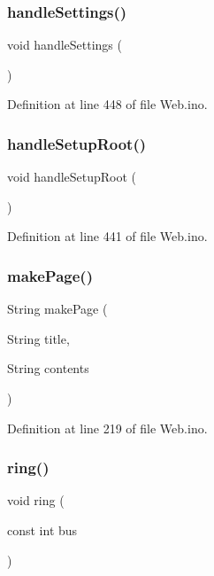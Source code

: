 \subsubsection{\texorpdfstring{handleSettings()}{handleSettings()}}
{\footnotesize\ttfamily void handle\+Settings (\begin{DoxyParamCaption}{ }\end{DoxyParamCaption})}



Definition at line 448 of file Web.\+ino.

\mbox{\label{_web_8ino_a211179d239a3a6fdc1ba1b6d7df252ae}} 
\subsubsection{\texorpdfstring{handleSetupRoot()}{handleSetupRoot()}}
{\footnotesize\ttfamily void handle\+Setup\+Root (\begin{DoxyParamCaption}{ }\end{DoxyParamCaption})}



Definition at line 441 of file Web.\+ino.

\mbox{\label{_web_8ino_a18fa0b0ca8bd45d3e784a6fd2d888b7d}} 
\subsubsection{\texorpdfstring{makePage()}{makePage()}}
{\footnotesize\ttfamily String make\+Page (\begin{DoxyParamCaption}\item[{String}]{title,  }\item[{String}]{contents }\end{DoxyParamCaption})}



Definition at line 219 of file Web.\+ino.

\mbox{\label{_web_8ino_a4b775e1d95473a982717aaa2da30e4f5}} 
\subsubsection{\texorpdfstring{ring()}{ring()}}
{\footnotesize\ttfamily void ring (\begin{DoxyParamCaption}\item[{const int}]{bus }\end{DoxyParamCaption})}



